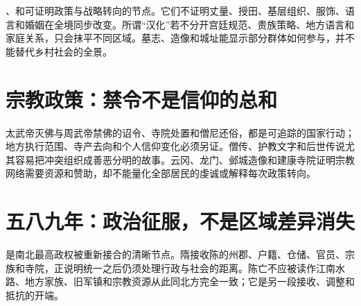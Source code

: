 、和可证明政策与战略转向的节点。它们不证明丈量、授田、基层组织、服饰、语言和婚姻在全境同步改变。所谓“汉化”若不分开宫廷规范、贵族策略、地方语言和家庭关系，只会抹平不同区域。墓志、造像和城址能显示部分群体如何参与，并不能替代乡村社会的全景。

\section{宗教政策：禁令不是信仰的总和}

太武帝灭佛与周武帝禁佛的诏令、寺院处置和僧尼还俗，都是可追踪的国家行动；地方执行范围、寺产去向和个人信仰变化必须另证。僧传、护教文字和后世传说尤其容易把冲突组织成善恶分明的故事。云冈、龙门、邺城造像和建康寺院证明宗教网络需要资源和赞助，却不能量化全部居民的虔诚或解释每次政策转向。

\section{五八九年：政治征服，不是区域差异消失}

是南北最高政权被重新接合的清晰节点。隋接收陈的州郡、户籍、仓储、官员、宗族和寺院，正说明统一之后仍须处理行政与社会的距离。陈亡不应被读作江南水路、地方家族、旧军镇和宗教资源从此同北方完全一致；它是另一段接收、调整和抵抗的开端。
